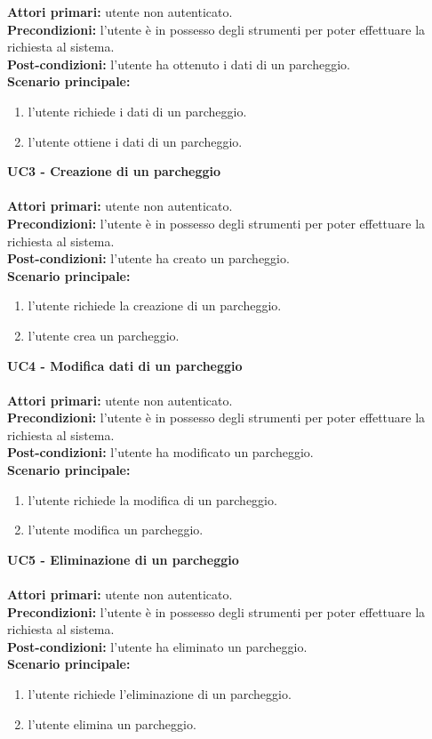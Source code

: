\textbf{Attori primari:} utente non autenticato.
\\
\textbf{Precondizioni:} l'utente è in possesso degli strumenti per poter effettuare la richiesta al sistema.
\\
\textbf{Post-condizioni:} l'utente ha ottenuto i dati di un parcheggio.
\\
\textbf{Scenario principale:}
\begin{enumerate}
    \item l'utente richiede i dati di un parcheggio.
    \item l'utente ottiene i dati di un parcheggio.
\end{enumerate}
\leavevmode\newline
\textbf{UC3 - Creazione di un parcheggio}
\\\\
\textbf{Attori primari:} utente non autenticato.
\\
\textbf{Precondizioni:} l'utente è in possesso degli strumenti per poter effettuare la richiesta al sistema.
\\
\textbf{Post-condizioni:} l'utente ha creato un parcheggio.
\\
\textbf{Scenario principale:}
\begin{enumerate}
    \item l'utente richiede la creazione di un parcheggio.
    \item l'utente crea un parcheggio.
\end{enumerate}
\leavevmode\newline
\textbf{UC4 - Modifica dati di un parcheggio}
\\\\
\textbf{Attori primari:} utente non autenticato.
\\
\textbf{Precondizioni:} l'utente è in possesso degli strumenti per poter effettuare la richiesta al sistema.
\\
\textbf{Post-condizioni:} l'utente ha modificato un parcheggio.
\\
\textbf{Scenario principale:}
\begin{enumerate}
    \item l'utente richiede la modifica di un parcheggio.
    \item l'utente modifica un parcheggio.
\end{enumerate}
\leavevmode\newline
\textbf{UC5 - Eliminazione di un parcheggio}
\\\\
\textbf{Attori primari:} utente non autenticato.
\\
\textbf{Precondizioni:} l'utente è in possesso degli strumenti per poter effettuare la richiesta al sistema.
\\
\textbf{Post-condizioni:} l'utente ha eliminato un parcheggio.
\\
\textbf{Scenario principale:}
\begin{enumerate}
    \item l'utente richiede l'eliminazione di un parcheggio.
    \item l'utente elimina un parcheggio.
\end{enumerate}
\leavevmode\newline


